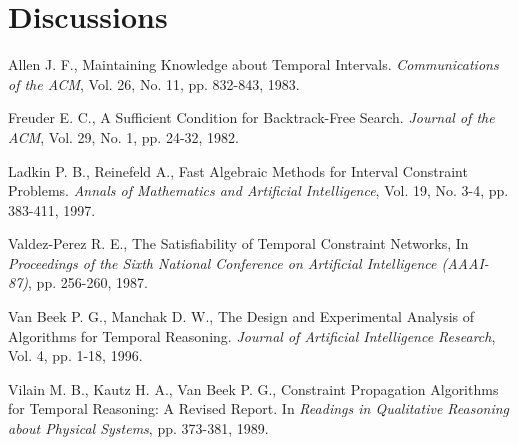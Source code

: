 \documentclass[11pt]{report}
\begin{document}
    \section{Discussions} 

  \begin{thebibliography}{M}
      Allen J. F.,
      Maintaining Knowledge about Temporal Intervals.
      {\em Communications of the ACM},
      Vol. 26, No. 11, pp. 832-843,
      1983.

      Freuder E. C.,
      A Sufficient Condition for Backtrack-Free Search.
      {\em Journal of the ACM},
      Vol. 29, No. 1, pp. 24-32,
      1982.

      Ladkin P. B., Reinefeld A.,
      Fast Algebraic Methods for Interval Constraint Problems.
      {\em Annals of Mathematics and Artificial Intelligence},
      Vol. 19, No. 3-4, pp. 383-411,
      1997.

      Valdez-Perez R. E.,
      The Satisfiability of Temporal Constraint Networks,
      In {\em Proceedings of the Sixth National Conference on Artificial Intelligence (AAAI-87)},
      pp. 256-260,
      1987.

      Van Beek P. G., Manchak D. W.,
      The Design and Experimental Analysis of Algorithms for Temporal Reasoning.
      {\em Journal of Artificial Intelligence Research},
      Vol. 4, pp. 1-18,
      1996.

      Vilain M. B., Kautz H. A., Van Beek P. G.,
      Constraint Propagation Algorithms for Temporal Reasoning: A Revised Report.
      In {\em Readings in Qualitative Reasoning about Physical Systems},
      pp. 373-381,
      1989.
  \end{thebibliography}
\end{document}
